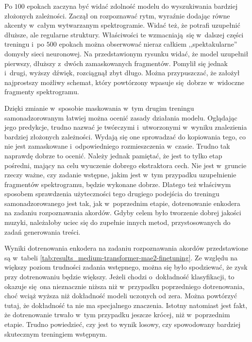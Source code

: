 Po $100$ epokach zaczyna być widać zdolność modelu do wyszukiwania bardziej złożonych zależności. Zaczął on rozpoznawać rytm, wyraźnie dodając równe akcenty w~całym wytwarzanym spektrogramie. Widać też, że potrafi uzupełnić dłuższe, ale regularne struktury. Właściwości te wzmacniają się w~dalszej części treningu i~po $500$ epokach można obserwować nieraz całkiem ,,spektakularne'' domysły sieci neuronowej. Na przedstawionym rysunku widać, że model uzupełnił pierwszy, dłuższy z~dwóch zamaskowanych fragmentów. Pomylił się jednak i~drugi, wyższy dźwięk, rozciągnął zbyt długo. Można przypuszczać, że założył najprostszy możliwy schemat, który powtórzony wpasuje się dobrze w~widoczne fragmenty spektrogramu. 

Dzięki zmianie w~sposobie maskowania w~tym drugim treningu samonadzorowanym łatwiej można ocenić zasady działania modelu. Oglądając jego predykcje, trudno nazwać je twórczymi i~utworzonymi w~wyniku znalezienia bardziej złożonych zależności. Wydają się one sprowadzać do kopiowania tego, co nie jest zamaskowane i~odpowiedniego rozmieszczenia w~czasie. Trudno tak naprawdę dobrze to ocenić. Należy jednak pamiętać, że jest to tylko etap pośredni, mający na celu wyuczenie dobrego ekstraktora cech. Nie jest w~gruncie rzeczy ważne, czy zadanie wstępne, jakim jest w~tym przypadku uzupełnienie fragmentów spektrogramu, będzie wykonane dobrze. Dlatego też właściwym sposobem sprawdzenia użyteczności tego drugiego podejścia do treningu samonadzorowanego jest tak, jak w~poprzednim etapie, dotrenowanie enkodera na zadaniu rozpoznawania akordów. Gdyby celem było tworzenie dobrej jakości muzyki, należałoby uciec się do zupełnie innych metod, przystosowanych do zadań generowania treści.

Wyniki dotrenowania enkodera na zadaniu rozpoznawania akordów przedstawione są w~tabeli \ref{tab:results_medium-transformer-mae2-finetuning}. Ze względu na większy poziom trudności zadania wstępnego, można się było spodziewać, że zysk przy dotrenowaniu będzie większy. Jeżeli chodzi o~dokładność klasyfikacji, to okazuje się ona nieznacznie niższa niż w~przypadku poprzedniego dotrenowania, choć wciąż wyższa niż dokładność modeli uczonych od zera. Można powtórzyć tutaj, że dokładność ta nie ma specjalnego znaczenia. Istotny natomiast jest fakt, że dotrenowanie trwało w~tym przypadku jeszcze krócej, niż w~poprzednim etapie. Trudno powiedzieć, czy jest to wynik losowy, czy spowodowany bardziej skutecznym treningiem wstępnym.

